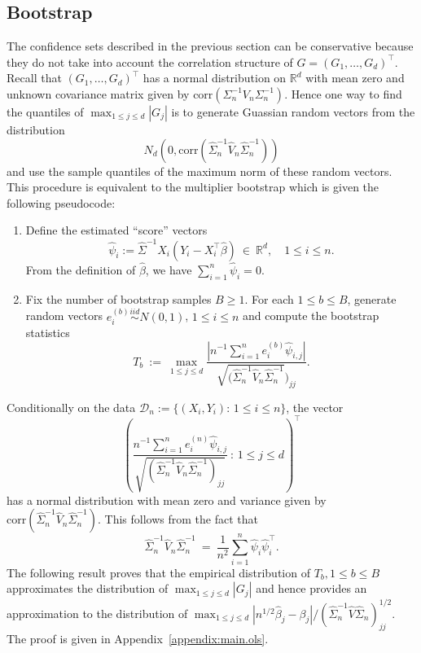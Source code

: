 \documentclass[11pt]{article}
\begin{document}
\subsection{Bootstrap}
The confidence sets described in the previous section can be conservative because they do not take into account the correlation structure of $G = (G_1, \ldots, G_d)^{\top}$.  
Recall that $(G_1, \ldots, G_d)^{\top}$ has a normal distribution on $\mathbb{R}^d$ with mean zero and unknown covariance matrix given by $\mbox{corr}(\Sigma_n^{-1}V_n\Sigma_n^{-1})$. Hence one way to find the quantiles of $\max_{1\le j\le d}|G_j|$ is to generate Guassian random vectors from the distribution $$N_d(0, \mbox{corr}(\widehat{\Sigma}_n^{-1}\widehat{V}_n\widehat{\Sigma}_n^{-1}))$$ and use the sample quantiles of the maximum norm of these random vectors. This procedure is equivalent to the multiplier bootstrap which is given the following pseudocode:
\begin{enumerate}
	\item Define the estimated ``score'' vectors 
	\[
	\widehat{\psi}_i := \widehat{\Sigma}^{-1}X_i(Y_i - X_i^{\top}\widehat{\beta})~\in~\mathbb{R}^d, \quad 1 \leq i \leq n.
	\]
	From the definition of $\widehat{\beta}$, we have $\sum_{i=1}^n \widehat{\psi}_i = 0.$
	\item Fix the number of bootstrap samples $B \ge 1$. For each $1 \leq b \leq B$, generate random vectors $e_i^{(b)}\overset{iid}{\sim} N(0, 1)$, $1\le i\le n$ and compute the bootstrap statistics
	\[
	T_b ~:=~ \max_{1\le j\le d}\frac{|n^{-1}\sum_{i=1}^n e_i^{(b)}\widehat{\psi}_{i,j}|}{\sqrt{(\widehat{\Sigma}_n^{-1}\widehat{V}_n\widehat{\Sigma}_n^{-1}})_{jj}}.
	\]
\end{enumerate}
Conditionally on the data $\mathcal{D}_n := \{(X_i, Y_i):\,1\le i\le n\}$, the vector
\[
\left(\frac{n^{-1}\sum_{i=1}^n e_i^{(n)}\widehat{\psi}_{i,j}}{\sqrt{(\widehat{\Sigma}_n^{-1}\widehat{V}_n\widehat{\Sigma}_n^{-1})_{jj}}}~:\, 1\le j\le d\right)^{\top}
\]
has a normal distribution with mean zero and variance given by $\mbox{corr}(\widehat{\Sigma}_n^{-1}\widehat{V}_n\widehat{\Sigma}_n^{-1})$. This follows from the fact that $$\widehat{\Sigma}_n^{-1}\widehat{V}_n\widehat{\Sigma}_n^{-1} ~=~ \frac{1}{n^2}\sum_{i=1}^n \widehat{\psi}_i\widehat{\psi}_i^{\top}.$$
The following result proves that the empirical distribution of $T_b, 1\le b\le B$ approximates the distribution of $\max_{1\le j\le d}|G_j|$ and hence provides an approximation to the distribution of $\max_{1\le j\le d}|n^{1/2}\widehat{\beta}_j - \beta_j|/(\widehat{\Sigma}_n^{-1}\widehat{V}\widehat{\Sigma}_n)_{jj}^{1/2}$. The proof is given in Appendix~\ref{appendix:main.ols}.
\end{document}

